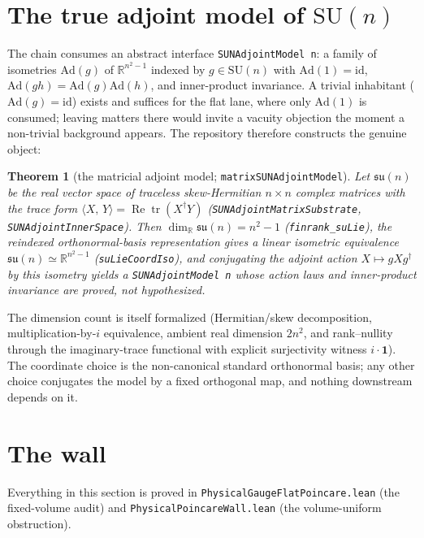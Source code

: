 \documentclass[11pt]{article}
\newtheorem{theorem}{Theorem}[section]
\theoremstyle{definition}
\newcommand{\lean}[1]{\texttt{#1}}
\newcommand{\R}{\mathbb{R}}
\newcommand{\SU}{\mathrm{SU}}
\newcommand{\su}{\mathfrak{su}}
\newcommand{\inn}[2]{\langle #1,\, #2\rangle}
\begin{document}
\section{The true adjoint model of $\SU(n)$}\label{sec:adj}

The chain consumes an abstract interface \lean{SUNAdjointModel n}: a
family of isometries $\mathrm{Ad}(g)$ of $\R^{n^2-1}$ indexed by
$g\in\SU(n)$ with $\mathrm{Ad}(1)=\mathrm{id}$,
$\mathrm{Ad}(gh)=\mathrm{Ad}(g)\mathrm{Ad}(h)$, and inner-product
invariance.  A trivial inhabitant ($\mathrm{Ad}(g)=\mathrm{id}$) exists
and suffices for the flat lane, where only $\mathrm{Ad}(1)$ is consumed;
leaving matters there would invite a vacuity objection the moment a
non-trivial background appears.  The repository therefore constructs the
genuine object:

\begin{theorem}[the matricial adjoint model;
\lean{matrixSUNAdjointModel}]\label{thm:adj}
Let $\su(n)$ be the real vector space of traceless skew-Hermitian
$n\times n$ complex matrices with the trace form
$\inn{X}{Y} = \operatorname{Re}\operatorname{tr}(X^{\dagger}Y)$
(\lean{SUNAdjointMatrixSubstrate}, \lean{SUNAdjointInnerSpace}).  Then
$\dim_{\R}\su(n) = n^2-1$ (\lean{finrank\_suLie}), the reindexed
orthonormal-basis representation gives a linear isometric equivalence
$\su(n)\simeq\R^{n^2-1}$ (\lean{suLieCoordIso}), and conjugating the
adjoint action $X\mapsto gXg^{\dagger}$ by this isometry yields a
\lean{SUNAdjointModel n} whose action laws and inner-product invariance
are proved, not hypothesized.
\end{theorem}

The dimension count is itself formalized (Hermitian/skew decomposition,
multiplication-by-$i$ equivalence, ambient real dimension $2n^2$, and
rank--nullity through the imaginary-trace functional with explicit
surjectivity witness $i\cdot\mathbf{1}$).  The coordinate choice is the
non-canonical standard orthonormal basis; any other choice conjugates
the model by a fixed orthogonal map, and nothing downstream depends on
it.

\section{The wall}\label{sec:wall}

Everything in this section is proved in
\lean{PhysicalGaugeFlatPoincare.lean} (the fixed-volume audit) and
\lean{PhysicalPoincareWall.lean} (the volume-uniform obstruction).
\end{document}
